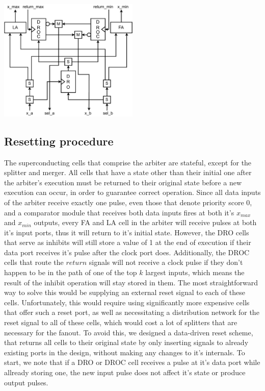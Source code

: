\documentclass[conference]{IEEEtran}
\begin{document}
\includegraphics*[width=0.5\textwidth]{figures/circuit_comparator.drawio.pdf}

\subsection{Resetting procedure}
The superconducting cells that comprise the arbiter are stateful, except for the splitter and merger.
All cells that have a state other than their initial one after the arbiter's execution must be returned to their original state before a new execution can occur, in order to guarantee correct operation.
Since all data inputs of the arbiter receive exactly one pulse, even those that denote priority score 0, and a comparator module that receives both data inputs fires at both it's $x_{max}$ and $x_{min}$ outputs, every FA and LA cell in the arbiter will receive pulses at both it's input ports, thus it will return to it's initial state.
However, the DRO cells that serve as inhibits will still store a value of 1 at the end of execution if their data port receives it's pulse after the clock port does. 
Additionally, the DROC cells that route the $return$ signals will not receive a clock pulse if they don't happen to be in the path of one of the top $k$ largest inputs, which means the result of the inhibit operation will stay stored in them.
The most straightforward way to solve this would be supplying an external reset signal to each of these cells.
Unfortunately, this would require using significantly more expensive cells that offer such a reset port, as well as necessitating a distribution network for the reset signal to all of these cells, which would cost a lot of splitters that are necessary for the fanout.
To avoid this, we designed a data-driven reset scheme, that returns all cells to their original state by only inserting signals to already existing ports in the design, without making any changes to it's internals.
To start, we note that if a DRO or DROC cell receives a pulse at it's data port while allready storing one, the new input pulse does not affect it's state or produce output pulses. 
\end{document}
